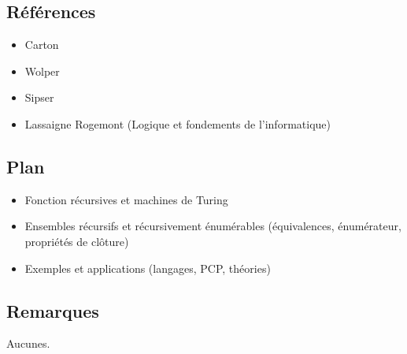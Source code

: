 \documentclass[../../Agregation.tex]{subfiles}
\begin{document}

\dvts

\subsection{Références}

\begin{itemize}
	\item Carton
	\item Wolper
	\item Sipser
	\item Lassaigne Rogemont (Logique et fondements de l'informatique)
	
\end{itemize}

\subsection{Plan}

\begin{itemize}
	\item Fonction récursives et machines de Turing
	\item Ensembles récursifs et récursivement énumérables (équivalences, énumérateur, propriétés de clôture)
	\item Exemples et applications (langages, PCP, théories)
\end{itemize}

\subsection{Remarques}

Aucunes.
\end{document}
